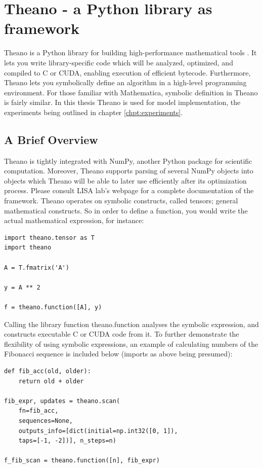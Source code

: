 \section{Theano - a Python library as framework}

Theano is a Python library for building high-performance mathematical tools \citep{Bergstra2010}. It lets you write library-specific code which will be analyzed, optimized, and compiled to C or CUDA, enabling execution of efficient bytecode. Furthermore, Theano lets you symbolically define an algorithm in a high-level programming environment. For those familiar with Mathematica, symbolic definition in Theano is fairly similar. In this thesis Theano is used for model implementation, the experiments being outlined in chapter \ref{chpt:experiments}.

\subsection{A Brief Overview}

Theano is tightly integrated with NumPy, another Python package for scientific computation. Moreover, Theano supports parsing of several NumPy objects into objects which Theano will be able to later use efficiently after its optimization process. Please consult LISA lab's webpage \citep{LISA-lab2015a} for a complete documentation of the framework.
Theano operates on symbolic constructs, called tensors; general mathematical constructs. So in order to define a function, you would write the actual mathematical expression, for instance:

\begin{verbatim}
import theano.tensor as T
import theano

A = T.fmatrix('A')

y = A ** 2

f = theano.function([A], y)
\end{verbatim}

Calling the library function theano.function analyses the symbolic expression, and constructs executable C or CUDA code from it. To further demonstrate the flexibility of using symbolic expressions, an example of calculating numbers of the Fibonacci sequence is included below (imports as above being presumed):

\begin{verbatim}
def fib_acc(old, older):
    return old + older

fib_expr, updates = theano.scan(
    fn=fib_acc,
    sequences=None,
    outputs_info=[dict(initial=np.int32([0, 1]), 
    taps=[-1, -2])], n_steps=n)

f_fib_scan = theano.function([n], fib_expr)
\end{verbatim}

